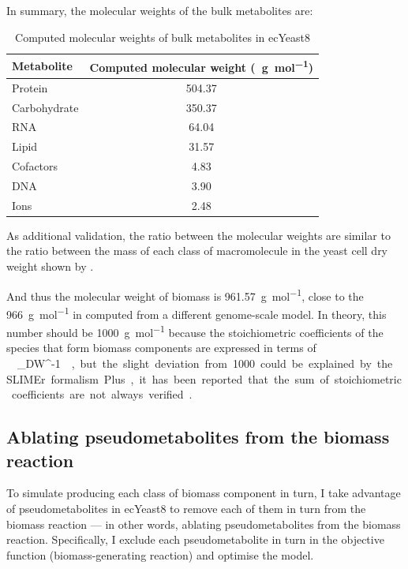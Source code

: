 In summary, the molecular weights of the bulk metabolites are:
\begin{table}[ht]
  \centering
  \begin{tabular}{lS}
    Metabolite & {Computed molecular weight (\SI{}{\gram~\mol^{-1}})} \\
    \hline
    Protein & 504.37 \\
    Carbohydrate & 350.37 \\
    RNA & 64.04 \\
    Lipid & 31.57 \\
    Cofactors & 4.83 \\
    DNA & 3.90 \\
    Ions & 2.48
  \end{tabular}
  \caption{Computed molecular weights of bulk metabolites in ecYeast8}
  \label{tab:ecyeast8-mol-weights}
\end{table}

As additional validation, the ratio between the molecular weights are similar to the ratio between the mass of each class of macromolecule in the yeast cell dry weight shown by \textcite{canelasVivoDatadrivenFramework2011}.

And thus the molecular weight of biomass is \SI{961.57}{\gram~\mol^{-1}}, close to the \SI{966}{\gram~\mol^{-1}} in \textcite{takhaveevTemporalSegregationBiosynthetic2023} computed from a different genome-scale model.
In theory, this number should be \SI{1000}{\gram~\mol^{-1}} because the stoichiometric coefficients of the species that form biomass components are expressed in terms of \SI{}{\milli\mol~\gram_{DW}^{-1}} \parencite{thieleProtocolGeneratingHighquality2010, palssonSystemsBiologyConstraintbased2015}, but the slight deviation from 1000 could be explained by the SLIMEr formalism.
Plus, it has been reported that the sum of stoichiometric coefficients are not always verified \parencite{chanStandardizingBiomassReactions2017}.

\subsection{Ablating pseudometabolites from the biomass reaction}
\label{subsec:model-yeast8-pseudometabolites}

To simulate producing each class of biomass component in turn,
I take advantage of pseudometabolites in ecYeast8 to remove each of them in turn from the biomass reaction ---
in other words, ablating pseudometabolites from the biomass reaction.
Specifically, I exclude each pseudometabolite in turn in the objective function (biomass-generating reaction) and optimise the model.

